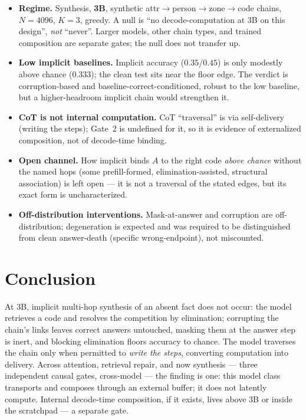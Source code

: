 \documentclass[11pt]{article}
\begin{document}
\begin{itemize}
\item \textbf{Regime.} Synthesis, \textbf{3B}, synthetic attr$\to$person$\to$zone$\to$code
chains, $N{=}4096$, $K{=}3$, greedy. A null is ``no decode-computation at 3B on this
design'', \emph{not} ``never''. Larger models, other chain types, and trained
composition are separate gates; the null does not transfer up.
\item \textbf{Low implicit baselines.} Implicit accuracy ($0.35$/$0.45$) is only
modestly above chance ($0.333$); the clean test sits near the floor edge. The verdict
is corruption-based and baseline-correct-conditioned, robust to the low baseline, but
a higher-headroom implicit chain would strengthen it.
\item \textbf{CoT is not internal computation.} CoT ``traversal'' is via self-delivery
(writing the steps); Gate~2 is undefined for it, so it is evidence of externalized
composition, not of decode-time binding.
\item \textbf{Open channel.} How implicit binds $A$ to the right code \emph{above
chance} without the named hops (some prefill-formed, elimination-assisted, structural
association) is left open --- it is not a traversal of the stated edges, but its exact
form is uncharacterized.
\item \textbf{Off-distribution interventions.} Mask-at-answer and corruption are
off-distribution; degeneration is expected and was required to be distinguished from
clean answer-death (specific wrong-endpoint), not miscounted.
\end{itemize}

\section{Conclusion}
\label{sec:conc}

At $3$B, implicit multi-hop synthesis of an absent fact does not occur: the model
retrieves a code and resolves the competition by elimination; corrupting the chain's
links leaves correct answers untouched, masking them at the answer step is inert, and
blocking elimination floors accuracy to chance. The model traverses the chain only
when permitted to \emph{write the steps}, converting computation into delivery. Across
attention, retrieval repair, and now synthesis --- three independent causal gates,
cross-model --- the finding is one: this model class transports and composes through
an external buffer; it does not latently compute. Internal decode-time composition,
if it exists, lives above $3$B or inside the scratchpad --- a separate gate.
\end{document}
